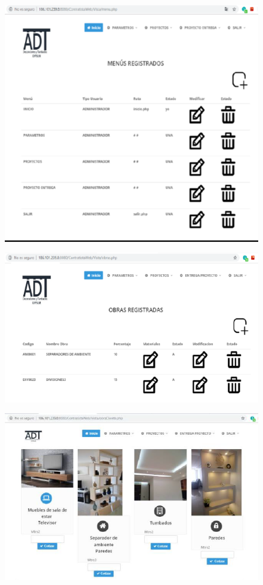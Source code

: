 \documentclass[12pt,a4paper]{article}
\begin{document}
\begin{figure}[hbtp]
\caption{}
\centering
\includegraphics[scale=0.5]{DECIMOQUINTA.png}
\end{figure}


\begin{figure}[hbtp]
\caption{}
\centering
\includegraphics[scale=0.5]{DECIMOSEXTA.png}
\end{figure}


\begin{figure}[hbtp]
\caption{}
\centering
\includegraphics[scale=0.5]{DECIMOSEPTIMA.png}
\end{figure}
\end{document}
